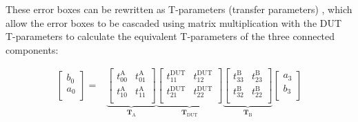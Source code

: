 \documentclass[../thesis/thesis.tex]{subfiles}
\begin{document}
\begin{refsection}
These error boxes can be rewritten as T-parameters (transfer parameters) \cite[pp.12--14]{Egan_2004}, which allow the error boxes to be cascaded using matrix multiplication with the DUT T-parameters to calculate the equivalent T-parameters of the three connected components:

\begin{align}
\begin{bmatrix}
b_0 \\
a_0 \\
\end{bmatrix}
=
&\underbrace{
	\begin{bmatrix}
	t^\textrm{A}_{00} & t^\textrm{A}_{01} \\
	t^\textrm{A}_{10} & t^\textrm{A}_{11} \\
	\end{bmatrix}
}_{\mathbf{T}_\textrm{A}}
\underbrace{
	\begin{bmatrix}
	t^\textrm{DUT}_{11} & t^\textrm{DUT}_{12} \\
	t^\textrm{DUT}_{21} & t^\textrm{DUT}_{22} \\
	\end{bmatrix}
}_{\mathbf{T}_\textrm{DUT}}
\underbrace{
	\begin{bmatrix}
	t^\textrm{B}_{33} & t^\textrm{B}_{23} \\
	t^\textrm{B}_{32} & t^\textrm{B}_{22} \\
	\end{bmatrix}
}_{\mathbf{T}_\textrm{B}}
\begin{bmatrix}
a_3 \\
b_3 \\
\end{bmatrix}
\end{align}


\end{refsection}
\end{document}
